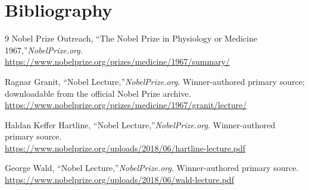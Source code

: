 \section{Bibliography}

\begin{thebibliography}{9}
Nobel Prize Outreach, ``The Nobel Prize in Physiology or Medicine 1967,''\emph{NobelPrize.org}.\\
\url{https://www.nobelprize.org/prizes/medicine/1967/summary/}

Ragnar Granit, ``Nobel Lecture,''\emph{NobelPrize.org}. Winner-authored primary source; downloadable from the official Nobel Prize archive.\\
\url{https://www.nobelprize.org/prizes/medicine/1967/granit/lecture/}

Haldan Keffer Hartline, ``Nobel Lecture,''\emph{NobelPrize.org}. Winner-authored primary source.\\
\url{https://www.nobelprize.org/uploads/2018/06/hartline-lecture.pdf}

George Wald, ``Nobel Lecture,''\emph{NobelPrize.org}. Winner-authored primary source.\\
\url{https://www.nobelprize.org/uploads/2018/06/wald-lecture.pdf}
\end{thebibliography}
